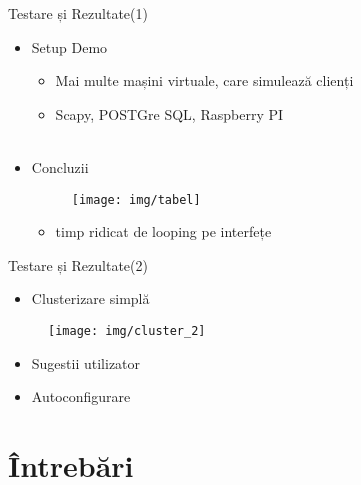 \documentclass{beamer}
\begin{document}
\begin{frame}{Testare și Rezultate(1)}
\pause
	\begin{itemize} [<+->]
	\item Setup Demo
		\begin{itemize} [<+->]
		\item Mai multe mașini virtuale, care simulează clienți
		\item Scapy, POSTGre SQL, Raspberry PI \\~\\
		\end{itemize}
	 \item Concluzii
	 \begin{figure}
        \texttt{[image: img/tabel]}
    	\end{figure}
	 \begin{itemize} [<+->]
	 	\item timp ridicat de looping pe interfețe
	 	\end{itemize}
	\end{itemize}
\end{frame}

\begin{frame}{Testare și Rezultate(2)}
	\begin{itemize}  
		\item Clusterizare simplă
	\end{itemize}
	\begin{figure}
		\texttt{[image: img/cluster\_2]}
	\end{figure}	
	\begin{itemize} [<+->]
		\item Sugestii utilizator
		\item Autoconfigurare
	\end{itemize}
\end{frame}

\section{\^{I}ntrebări}
\end{document}
